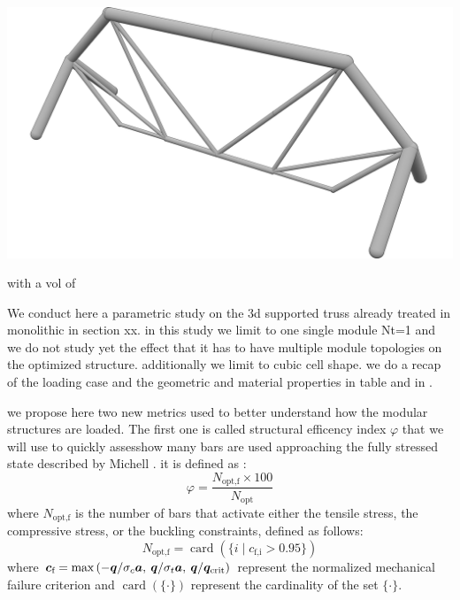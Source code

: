 \begin{marginfigure}
    \centering
    \includegraphics[width=\linewidth]{figures/04_TTO_improvements/16_supported_3D_sol/04_Topology_NLP_iso-min.png}
    \caption{with a vol of}
    \label{fig:05}
\end{marginfigure}
We conduct here a parametric study on the 3d supported truss already treated in monolithic in section xx. in this study we limit to one single module Nt=1 and we do not study yet the effect that it has to have multiple module topologies on the optimized structure. additionally we limit to cubic cell shape. we do a recap of the loading case and the geometric and material properties in table and in .

we propose here two new metrics used to better understand how the modular structures are loaded. The first one is called structural efficency index $\varphi$ that we will use to quickly assesshow many bars are used approaching the fully stressed state described by Michell . it is defined as :
\begin{equation}
    \varphi = \frac{N_\text{opt,f}\times100}{N_\text{opt}}
\end{equation}
where $N_\text{opt,f}$ is the number of bars that activate either the tensile stress, the compressive stress, or the buckling constraints, defined as follows:
\begin{equation}
    N_\text{opt,f} = \operatorname{card}(\{i\;|\;c_\text{f,i} > 0.95\})
\end{equation}
where $\bm{c}_\text{f}=\max{\left(-\bm{q} /\sigma_c \bm{a},\:\bm{q} /\sigma_t \bm{a},\:\bm{q}/\bm{q}_{\text{crit}}\right)}$ represent the normalized mechanical failure criterion and $\operatorname{card}(\{\cdot\})$ represent the cardinality of the set $\{\cdot\}$.

